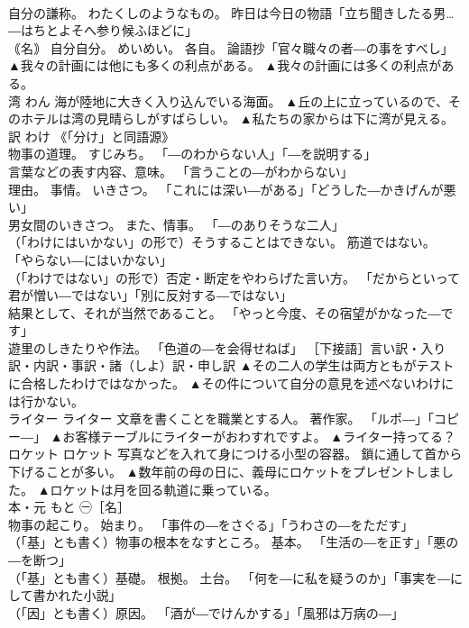 \documentclass[8pt]{extreport}
\begin{document}
\begin{CJK}{UTF8}{min}
\\	自分の謙称。 わたくしのようなもの。 昨日は今日の物語「立ち聞きしたる男…―はちとよそへ参り候ふほどに」 
\\	｟名｠ 自分自分。 めいめい。 各自。 論語抄「官々職々の者―の事をすべし」	▲我々の計画には他にも多くの利点がある。 ▲我々の計画には多くの利点がある。
\\	湾	わん	海が陸地に大きく入り込んでいる海面。	▲丘の上に立っているので、そのホテルは湾の見晴らしがすばらしい。 ▲私たちの家からは下に湾が見える。
\\	訳	わけ	《「分け」と同語源》 
\\	物事の道理。 すじみち。 「―のわからない人」「―を説明する」 
\\	言葉などの表す内容、意味。 「言うことの―がわからない」 
\\	理由。 事情。 いきさつ。 「これには深い―がある」「どうした―かきげんが悪い」 
\\	男女間のいきさつ。 また、情事。 「―のありそうな二人」 
\\	（「わけにはいかない」の形で）そうすることはできない。 筋道ではない。 「やらない―にはいかない」 
\\	（「わけではない」の形で）否定・断定をやわらげた言い方。 「だからといって君が憎い―ではない」「別に反対する―ではない」 
\\	結果として、それが当然であること。 「やっと今度、その宿望がかなった―です」 
\\	遊里のしきたりや作法。 「色道の―を会得せねば」 ［下接語］言い訳・入り訳・内訳・事訳・諸（しよ）訳・申し訳	▲その二人の学生は両方ともがテストに合格したわけではなかった。 ▲その件について自分の意見を述べないわけには行かない。
\\	ライター	ライター	文章を書くことを職業とする人。 著作家。 「ルポ―」「コピー―」	▲お客様テーブルにライターがおわすれですよ。 ▲ライター持ってる？
\\	ロケット	ロケット	写真などを入れて身につける小型の容器。 鎖に通して首から下げることが多い。	▲数年前の母の日に、義母にロケットをプレゼントしました。 ▲ロケットは月を回る軌道に乗っている。
\\	本・元	もと	㊀［名］ 
\\	物事の起こり。 始まり。 「事件の―をさぐる」「うわさの―をただす」 
\\	（「基」とも書く）物事の根本をなすところ。 基本。 「生活の―を正す」「悪の―を断つ」 
\\	（「基」とも書く）基礎。 根拠。 土台。 「何を―に私を疑うのか」「事実を―にして書かれた小説」 
\\	（「因」とも書く）原因。 「酒が―でけんかする」「風邪は万病の―」 

\end{CJK}
\end{document}
